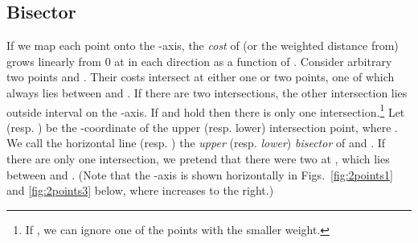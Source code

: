 \documentclass[preprint,10pt]{elsarticle}
\begin{document}
\subsection{Bisector}\label{sec:bisector}
If we map each point  onto the -axis,
the {\em cost} of (or the weighted distance from) 
grows linearly from 0 at  in each direction as a function of .
Consider arbitrary two points  and .
Their costs intersect at either one or two points,
one of which always lies between  and .
If there are two intersections,
the other intersection lies outside interval  on the -axis.
If  and  hold
then there is only one intersection.\footnote{If ,
we can ignore one of the points with the smaller weight.
}
Let  (resp. ) be the -coordinate of the upper (resp. lower) intersection point,
where .
We call the horizontal line  (resp. )
the {\em upper} (resp. {\em lower}) {\em bisector} of  and .
If there are only one intersection,
we pretend that there were two at , which lies between  and .
(Note that the -axis is shown horizontally in Figs.~\ref{fig:2points1} and \ref{fig:2points3} below,
where  increases to the right.)
\end{document}
